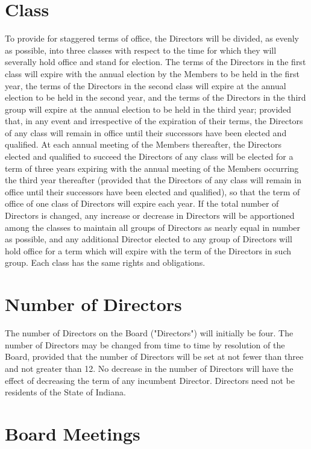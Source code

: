 \documentclass[
]{book}
\begin{document}
\section{Class}\label{class}

To provide for staggered terms of office, the Directors will be
divided, as evenly as possible, into three classes with respect to the
time for which they will severally hold office and stand for election.
The terms of the Directors in the first class will expire with the
annual election by the Members to be held in the first year, the terms
of the Directors in the second class will expire at the annual
election to be held in the second year, and the terms of the Directors
in the third group will expire at the annual election to be held in
the third year; provided that, in any event and irrespective of the
expiration of their terms, the Directors of any class will remain in
office until their successors have been elected and qualified. At each
annual meeting of the Members thereafter, the Directors elected and
qualified to succeed the Directors of any class will be elected for a
term of three years expiring with the annual meeting of the Members
occurring the third year thereafter (provided that the Directors of
any class will remain in office until their successors have been
elected and qualified), so that the term of office of one class of
Directors will expire each year. If the total number of Directors is
changed, any increase or decrease in Directors will be apportioned
among the classes to maintain all groups of Directors as nearly equal
in number as possible, and any additional Director elected to any
group of Directors will hold office for a term which will expire with
the term of the Directors in such group. Each class has the same
rights and obligations.

\section{Number of Directors}\label{number-of-directors}

The number of Directors on the Board ("Directors") will initially be
four. The number of Directors may be changed from time to time by
resolution of the Board, provided that the number of Directors will be
set at not fewer than three and not greater than 12. No decrease in
the number of Directors will have the effect of decreasing the term of
any incumbent Director. Directors need not be residents of the State
of Indiana.

\section{Board Meetings}\label{board-meetings}
\end{document}

